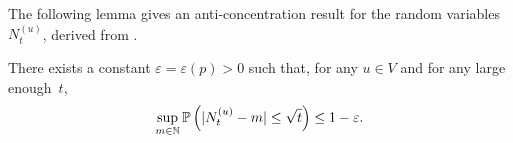 \documentclass{article}
\newcommand{\inote}[1]{{\color{blue} ({\bf Isa:} #1)}}
\newcommand{\Prob}[1]{\bbP\left(#1\right)}
\begin{document}

The following lemma gives an anti-concentration result for the random variables $N_t^{(u)}$, derived from .


\begin{lemma} \label{lem:anti_concentration_Nt}
    There exists a constant $\varepsilon = \varepsilon(p)>0$ such that, for any $u \in V$ and for any large enough~$t$,
    \begin{equation*}
        \sup_{m \in \mathbb{N}}\Prob{|N_t^{(u)}-m| \leq \sqrt{t}} \leq 1-\varepsilon.
    \end{equation*}
\end{lemma}
\end{document}
